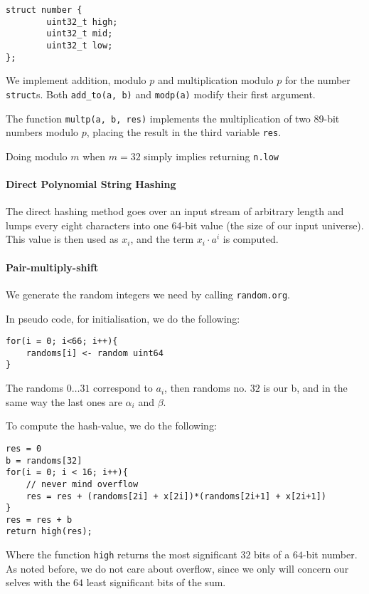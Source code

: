 \documentclass[]{article}
\newcommand{\funk}[1]{\small\texttt{#1}}
\begin{document}
\begin{verbatim}
struct number {
        uint32_t high;
        uint32_t mid;
        uint32_t low;
};
\end{verbatim}

We implement addition, modulo $p$ and multiplication modulo $p$ for the number \funk{struct}s. Both \funk{add\_to(a, b)} and \funk{modp(a)} modify their first argument.

The function \funk{multp(a, b, res)} implements the multiplication of two 89-bit numbers modulo $p$, placing the result in the third variable \funk{res}.

Doing modulo $m$ when $m = 32$ simply implies returning \funk{n.low}

\paragraph{Direct Polynomial String Hashing}

The direct hashing method goes over an input stream of arbitrary length and lumps every eight characters into one 64-bit value (the size of our input universe). This value is then used as $x_i$, and the term $x_i\cdot a^i$ is computed.

\paragraph{Pair-multiply-shift} 

We generate the random integers we need by calling \texttt{random.org}. 

In pseudo code, for initialisation, we do the following:

\begin{verbatim}
for(i = 0; i<66; i++){
    randoms[i] <- random uint64
}
\end{verbatim}

The randoms $0\ldots 31$ correspond to $a_i$, then randoms no. $32$ is our b, and in the same way the last ones are $\alpha_i$ and $\beta$.

To compute the hash-value, we do the following:
\begin{verbatim}
res = 0
b = randoms[32]
for(i = 0; i < 16; i++){
    // never mind overflow
    res = res + (randoms[2i] + x[2i])*(randoms[2i+1] + x[2i+1])
}
res = res + b
return high(res);
\end{verbatim}

Where the function \texttt{high} returns the most significant $32$ bits of a $64$-bit number.
As noted before, we do not care about overflow, since we only will concern our selves with the $64$ least significant bits of the sum.
\end{document}
